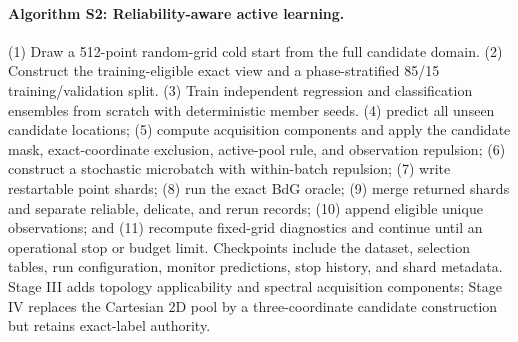 \paragraph{Algorithm S2: Reliability-aware active learning.}
(1) Draw a 512-point random-grid cold start from the full candidate domain. (2) Construct the training-eligible exact view and a phase-stratified 85/15 training/validation split. (3) Train independent regression and classification ensembles from scratch with deterministic member seeds. (4) predict all unseen candidate locations; (5) compute acquisition components and apply the candidate mask, exact-coordinate exclusion, active-pool rule, and observation repulsion; (6) construct a stochastic microbatch with within-batch repulsion; (7) write restartable point shards; (8) run the exact BdG oracle; (9) merge returned shards and separate reliable, delicate, and rerun records; (10) append eligible unique observations; and (11) recompute fixed-grid diagnostics and continue until an operational stop or budget limit.  Checkpoints include the dataset, selection tables, run configuration, monitor predictions, stop history, and shard metadata. Stage III adds topology applicability and spectral acquisition components; Stage IV replaces the Cartesian 2D pool by a three-coordinate candidate construction but retains exact-label authority.

